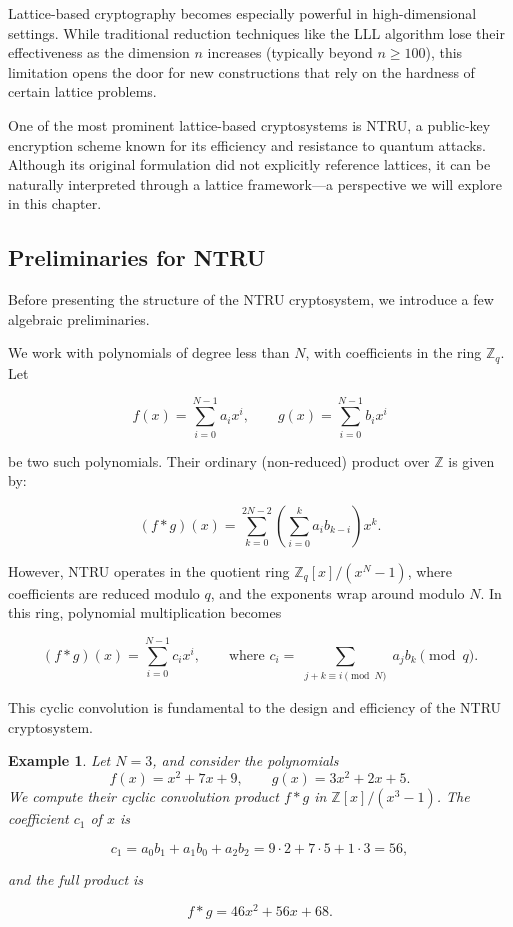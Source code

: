 \documentclass[a4paper,12pt]{article}
\newtheorem*{example}{Example}
\begin{document}
Lattice-based cryptography becomes especially powerful in high-dimensional settings. While traditional reduction techniques like the \textsc{LLL} algorithm lose their effectiveness as the dimension \( n \) increases (typically beyond \( n \geq 100 \)), this limitation opens the door for new constructions that rely on the hardness of certain lattice problems.

One of the most prominent lattice-based cryptosystems is \textsc{NTRU}, a public-key encryption scheme known for its efficiency and resistance to quantum attacks. Although its original formulation did not explicitly reference lattices, it can be naturally interpreted through a lattice framework—a perspective we will explore in this chapter.

\bigskip

\subsection*{Preliminaries for NTRU}
Before presenting the structure of the NTRU cryptosystem, we introduce a few algebraic preliminaries.

We work with polynomials of degree less than \( N \), with coefficients in the ring \( \mathbb{Z}_q \). Let

\[
f(x) = \sum_{i=0}^{N-1} a_i x^i, \qquad g(x) = \sum_{i=0}^{N-1} b_i x^i
\]

be two such polynomials. Their ordinary (non-reduced) product over \( \mathbb{Z} \) is given by:

\[
(f * g)(x) = \sum_{k=0}^{2N-2} \left( \sum_{i=0}^k a_i b_{k-i} \right) x^k.
\]

However, NTRU operates in the quotient ring \( \mathbb{Z}_q[x]/(x^N - 1) \), where coefficients are reduced modulo \( q \), and the exponents wrap around modulo \( N \). In this ring, polynomial multiplication becomes

\[
(f \ast g)(x) = \sum_{i=0}^{N-1} c_i x^i, \qquad \text{where } c_i = \sum_{\substack{j + k \equiv i \!\!\!\! \pmod{N}}} a_j b_k \pmod{q}.
\]

This cyclic convolution is fundamental to the design and efficiency of the NTRU cryptosystem.

\medskip
\begin{example}
Let \( N = 3 \), and consider the polynomials
\[
f(x) = x^2 + 7x + 9, \qquad g(x) = 3x^2 + 2x + 5.
\]
We compute their cyclic convolution product \( f \ast g \) in \( \mathbb{Z}[x]/(x^3 - 1) \). The coefficient \( c_1 \) of \( x \) is

\[
c_1 = a_0 b_1 + a_1 b_0 + a_2 b_2 = 9 \cdot 2 + 7 \cdot 5 + 1 \cdot 3 = 56,
\]

and the full product is

\[
f \ast g = 46x^2 + 56x + 68.
\]
\end{example}
\end{document}
